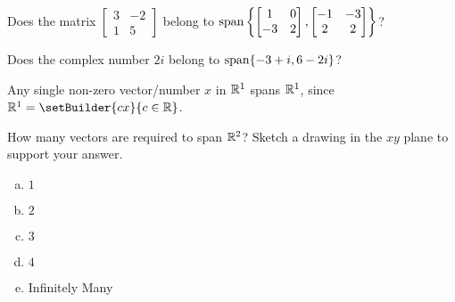 \begin{activity}{5}
  Does the matrix \(\begin{bmatrix}3&-2\\1&5\end{bmatrix}\) belong to
  \(\operatorname{span}\left\{\begin{bmatrix}1&0\\-3&2\end{bmatrix},
  \begin{bmatrix}-1&-3\\2&2\end{bmatrix}\right\}\)?
\end{activity}

\begin{activity}{5}
  Does the complex number \(2i\) belong to
  \(\operatorname{span}\{-3+i,6-2i\}\)?
\end{activity}


\begin{observation}
Any single non-zero vector/number \(x\) in \(\mathbb{R}^1\) spans \(\mathbb{R}^1\),
since \(\IR^1=\setBuilder{cx}{c\in\IR}\).

\begin{center}
\end{center}
\end{observation}


\begin{activity}{5}
  How many vectors are required to span \(\mathbb{R}^2\)?
  Sketch a drawing in the \(xy\) plane to support your answer.
  \begin{center}
  \end{center}
  
  \begin{enumerate}[(a)]
  \item $1$
  \item $2$
  \item $3$
  \item $4$
  \item Infinitely Many
  \end{enumerate}
\end{activity}

